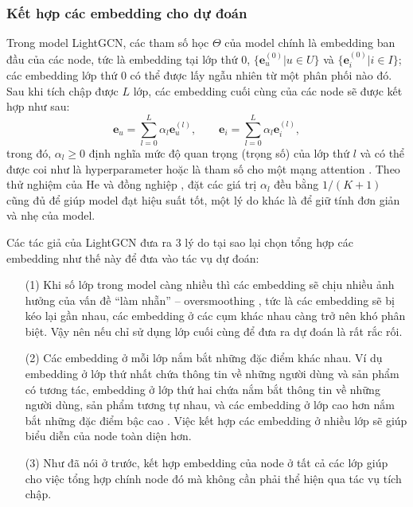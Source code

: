 \subsubsection{Kết hợp các embedding cho dự đoán}
\noindent Trong model LightGCN, các tham số học $\Theta$ của model chính là embedding ban đầu của các node, tức là embedding tại lớp thứ 0, $\{\mathbf{e}_u^{(0)} | u \in U\}$ và $\{\mathbf{e}_i^{(0)} | i \in I\}$; các embedding lớp thứ 0 có thể được lấy ngẫu nhiên từ một phân phối nào đó. Sau khi tích chập được $L$ lớp, các embedding cuối cùng của các node sẽ được kết hợp như sau:
\begin{equation}
    \mathbf{e}_u = \sum_{l=0}^{L}{\alpha_l \mathbf{e}_u^{(l)}}, \qquad
    \mathbf{e}_i = \sum_{l=0}^{L}{\alpha_l \mathbf{e}_i^{(l)}},
\end{equation}
trong đó, $\alpha_l \geq 0$ định nghĩa mức độ quan trọng (trọng số) của lớp thứ $l$ và có thể được coi như là hyperparameter hoặc là tham số cho một mạng attention \cite{survey:attention-models, attentive-CF}. Theo thử nghiệm của He và đồng nghiệp \cite{LightGCN}, đặt các giá trị $\alpha_l$ đều bằng $1/(K+1)$ cũng đủ để giúp model đạt hiệu suất tốt, một lý do khác là để giữ tính đơn giản và nhẹ của model.

\noindent Các tác giả của LightGCN đưa ra 3 lý do \cite{LightGCN} tại sao lại chọn tổng hợp các embedding như thế này để đưa vào tác vụ dự đoán:
\begin{itemize}
    \item[(1)] Khi số lớp trong model càng nhiều thì các embedding sẽ chịu nhiều ảnh hưởng của vấn đề ``làm nhẵn'' -- oversmoothing \cite{insights-GCN}, tức là các embedding sẽ bị kéo lại gần nhau, các embedding ở các cụm khác nhau càng trở nên khó phân biệt. Vậy nên nếu chỉ sử dụng lớp cuối cùng để đưa ra dự đoán là rất rắc rối.

    \item[(2)] Các embedding ở mỗi lớp nắm bắt những đặc điểm khác nhau. Ví dụ embedding ở lớp thứ nhất chứa thông tin về những người dùng và sản phẩm có tương tác, embedding ở lớp thứ hai chứa nắm bắt thông tin về những người dùng, sản phẩm tương tự nhau, và các embedding ở lớp cao hơn nắm bắt những đặc điểm bậc cao \cite{NGCF}. Việc kết hợp các embedding ở nhiều lớp sẽ giúp biểu diễn của node toàn diện hơn.

    \item[(3)] Như đã nói ở trước, kết hợp embedding của node ở tất cả các lớp giúp cho việc tổng hợp chính node đó mà không cần phải thể hiện qua tác vụ tích chập.
\end{itemize}

